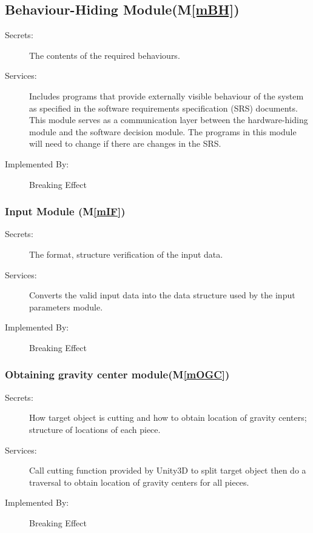 \documentclass[12pt, titlepage]{article}
\newcommand{\mref}[1]{M\ref{#1}}
\begin{document}
	\subsection{Behaviour-Hiding Module(\mref{mBH})}
	
	\begin{description}
		\item[Secrets:]The contents of the required behaviours.
		\item[Services:]Includes programs that provide externally visible behaviour of
		the system as specified in the software requirements specification (SRS)
		documents. This module serves as a communication layer between the
		hardware-hiding module and the software decision module. The programs in this
		module will need to change if there are changes in the SRS.
		\item[Implemented By:] Breaking Effect
	\end{description}
	
	\subsubsection{Input Module (\mref{mIF})}
	
	\begin{description}
		\item[Secrets:]The format, structure verification of the input data.
		\item[Services:]Converts the valid input data into the data structure used by the
		input parameters module. 
		\item[Implemented By:] Breaking Effect
	\end{description}
	
	\subsubsection{Obtaining gravity center module(\mref{mOGC})}
	
	\begin{description}
		\item[Secrets:]How target object is cutting and how to obtain location of gravity centers; structure of locations of each piece.
		\item[Services:]Call cutting function provided by Unity3D to split target object then do a traversal to obtain location of gravity centers for all pieces.
		\item[Implemented By:] Breaking Effect
	\end{description}
	
\end{document}
